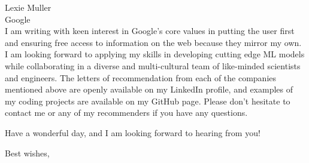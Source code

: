 \begin{letter}{%
  	Lexie Muller \\
    Google \\
    }
I am writing with keen interest in Google's core values in putting the user first and ensuring free access to information on the web because they mirror my own. I am looking forward to applying my skills in developing cutting edge ML models while collaborating in a diverse and multi-cultural team of like-minded scientists and engineers. The letters of recommendation from each of the companies mentioned above are openly available on my LinkedIn profile, and examples of my coding projects are available on my GitHub page. Please don't hesitate to contact me or any of my recommenders if you have any questions. 

Have a wonderful day, and I am looking forward to hearing from you!

    
	
    \closing{Best wishes,}
    
    
    
    
    
    
    \end{letter}




